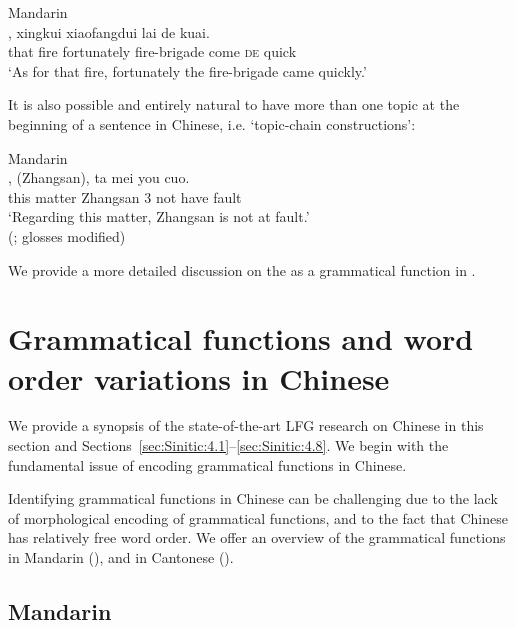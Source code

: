 \documentclass[output=paper,chinesefont,hidelinks]{langscibook}
\begin{document}
\ea%
    \label{ex:Sinitic:9}Mandarin\\
    ,   xingkui    xiaofangdui  lai  de  kuai.\\
         {\db}that  {\CLF}  fire    fortunately  fire-brigade  come  \textsc{de}  quick\\
         \glt `As for that fire, fortunately the fire-brigade came quickly.'\\
         \hspace*{\fill}\citep{LiThompson1976}
    \z

    It is also possible and entirely natural to have more than one topic at the beginning of a sentence in Chinese, i.e. `topic-chain constructions':

\ea%
    \label{ex:Sinitic:10}Mandarin\\
    ,     (Zhangsan),  ta  mei  you  cuo.\\
        {\db}this  {\CLF}  matter    {\db}Zhangsan  {3\SG}  not  have  fault\\
    \glt `Regarding this matter, Zhangsan is not at fault.'\\
         \hspace*{\fill} (\citealt{Her1990}; glosses modified)
    \z

  We provide a more detailed discussion on the {\TOPIC} as a grammatical function in . 

\section{Grammatical functions and word order variations in Chinese}
\label{sec:Sinitic:3}

We provide a synopsis of the state-of-the-art LFG research on Chinese in this section  and Sections~\ref{sec:Sinitic:4.1}--\ref{sec:Sinitic:4.8}. We begin with the fundamental issue of encoding grammatical functions in Chinese.

Identifying grammatical functions in Chinese can be challenging due to the lack of morphological encoding of grammatical functions, and to the fact that Chinese has relatively free word order. We offer an overview of the grammatical functions in Mandarin (), and in Cantonese ().

\subsection{Mandarin}
\label{sec:Sinitic:3.1.1}
\end{document}
